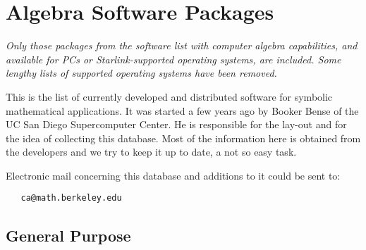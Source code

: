\newpage
\appendix
\section{\label{se_packages}Algebra Software Packages}

{\sl Only those packages from the software list with computer algebra
capabilities, and available for PCs or Starlink-supported operating
systems, are included.  Some lengthy lists of supported operating systems
have been removed.}

This is the  list of  currently  developed  and   distributed   software  for
symbolic mathematical applications. It was started a few years ago by  Booker
Bense of the UC San Diego Supercomputer Center. He is responsible for     the
lay-out and for the idea of collecting this database. Most of the information
here is obtained from the developers and we try to keep it up to date, a  not
so easy task.

Electronic mail concerning this database and additions to it could be
sent to:

\begin{verbatim}
   ca@math.berkeley.edu
\end{verbatim}

\subsection{General Purpose}

